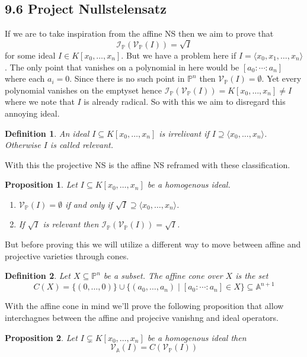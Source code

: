 \documentclass[40pt]{article}
\newtheorem{definition}{Definition}[section]
\newcommand{\Proj}{\mathbb{P}}
\newcommand{\A}{\mathbb{A}}
\newcommand{\I}{\mathcal{I}}
\newcommand{\V}{\mathcal{V}}
\newcommand{\la}{\langle}
\newcommand{\ra}{\rangle}
\newtheorem{proposition}{Proposition}[section]
\theoremstyle{remark}
\begin{document}
		\subsection{9.6 Project Nullstelensatz}
		If we are to take inspiration from the affine NS then we aim to prove that 
		\[
		\I_\Proj(\V_\Proj(I)) = \sqrt{I}
		\]
		for some ideal $I \in K[x_0,\dots,x_n]$. But we have a problem here if $I = \la x_0,x_1,\dots,x_n \ra$. The only point that vanishes on a polynomial in here would be $[a_0:
		\cdots:a_n]$ where each $a_i = 0$. Since there is no such point in $\Proj^n$ then $\V_\Proj(I) = \emptyset$. Yet every polynomial vanishes on the emptyset hence $\I_\Proj(\V_\Proj(I)) = K[x_0,\dots,x_n] \neq I$ where we note that $I$ is already radical. So with this we aim to disregard this annoying ideal. 
		\begin{definition}
			An ideal $I \subseteq K[x_0,\dots,x_n]$ is irrelivant if $I \supseteq \la x_0,\dots,x_n \ra$. Otherwise $I$ is called relevant. 
		\end{definition}
		With this the projective NS is the affine NS reframed with these classification. 
		\begin{proposition}
			Let $I \subseteq K[x_0,\dots,x_n]$ be a homogenous ideal. 
			\begin{enumerate}
				\item $\V_\Proj(I) = \emptyset$ if and only if $\sqrt{I} \supseteq \la x_0,\dots,x_n\ra$.
				\item If $\sqrt{I}$ is relevant then $\I_\Proj(\V_\Proj(I)) = \sqrt{I}$. 
			\end{enumerate}
		\end{proposition}
		But before proving this we will utilize a different way to move between affine and projective varieties through cones. 
		\begin{definition}
			Let $X \subseteq \Proj^n$ be a subset. The affine cone over $X$ is the set 
			\[
			C(X) = \{(0,\dots,0)\} \cup \{(a_0,\dots,a_n) \; | \; [a_0:\cdots:a_n] \in X\} \subseteq \A^{n+1}
			\]
		\end{definition}
		With the affine cone in mind we'll prove the following proposition that allow interchagnes between the affine and projecive vanishng and ideal operators.
		\begin{proposition}
			Let $I \subsetneq K[x_0,\dots,x_n]$ be a homogenous ideal then 
			\[
			\V_\A(I) = C(\V_\Proj(I))
			\]
		\end{proposition}
\end{document}

